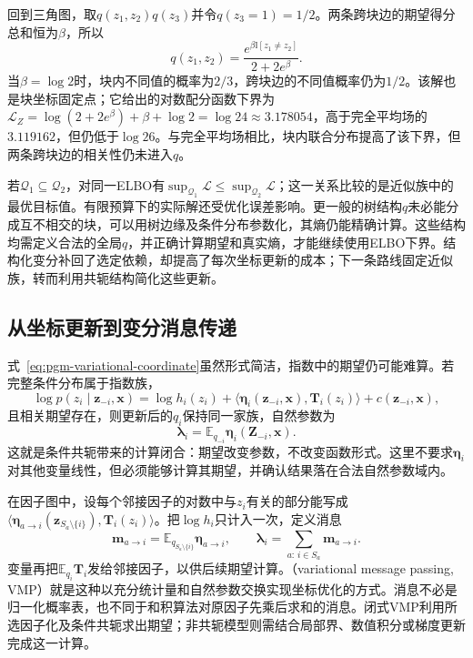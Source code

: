 回到三角图，取$q(z_1,z_2)q(z_3)$并令$q(z_3=1)=1/2$。两条跨块边的期望得分总和恒为$\beta$，所以
\[
  q(z_1,z_2)=
    \frac{e^{\beta\mathbb I[z_1\ne z_2]}}{2+2e^\beta}.
\]
当$\beta=\log2$时，块内不同值的概率为$2/3$，跨块边的不同值概率仍为$1/2$。该解也是块坐标固定点；它给出的对数配分函数下界为$\mathcal L_Z=\log(2+2e^\beta)+\beta+\log2=\log24\approx3.178054$，高于完全平均场的$3.119162$，但仍低于$\log26$。与完全平均场相比，块内联合分布提高了该下界，但两条跨块边的相关性仍未进入$q$。

若$\mathcal Q_1\subseteq\mathcal Q_2$，对同一ELBO有$\sup_{\mathcal Q_1}\mathcal L\leq\sup_{\mathcal Q_2}\mathcal L$；这一关系比较的是近似族中的最优目标值。有限预算下的实际解还受优化误差影响。更一般的树结构$q$未必能分成互不相交的块，可以用树边缘及条件分布参数化，其熵仍能精确计算。这些结构均需定义合法的全局$q$，并正确计算期望和真实熵，才能继续使用ELBO下界。结构化变分补回了选定依赖，却提高了每次坐标更新的成本；下一条路线固定近似族，转而利用共轭结构简化这些更新。

\subsection{从坐标更新到变分消息传递}
\label{sec:pgm-variational-coordinate-vmp}
\label{sec:pgm-variational-vmp}

式~\eqref{eq:pgm-variational-coordinate}虽然形式简洁，指数中的期望仍可能难算。若完整条件分布属于指数族，
\[
  \log p(z_i\mid\bm{z}_{-i},\bm{x})
    =\log h_i(z_i)
      +\langle\bm{\eta}_i(\bm{z}_{-i},\bm{x}),\bm T_i(z_i)\rangle
      +c(\bm{z}_{-i},\bm{x}),
\]
且相关期望存在，则更新后的$q_i$保持同一家族，自然参数为
\begin{equation}
  \bm{\lambda}_i
    =\mathbb E_{q_{-i}}\bm{\eta}_i(\bm{Z}_{-i},\bm{x}).
  \label{eq:pgm-variational-conjugacy}
\end{equation}
这就是条件共轭带来的计算闭合：期望改变参数，不改变函数形式。这里不要求$\bm{\eta}_i$对其他变量线性，但必须能够计算其期望，并确认结果落在合法自然参数域内。

在因子图中，设每个邻接因子的对数中与$z_i$有关的部分能写成$\langle\bm{\eta}_{a\to i}(\bm z_{S_a\setminus\{i\}}),\bm T_i(z_i)\rangle$。把$\log h_i$只计入一次，定义消息
\[
  \bm m_{a\to i}
    =\mathbb E_{q_{S_a\setminus\{i\}}}\bm{\eta}_{a\to i},
  \qquad
  \bm{\lambda}_i=\sum_{a:\,i\in S_a}\bm m_{a\to i}.
\]
变量再把$\mathbb E_{q_i}\bm T_i$发给邻接因子，以供后续期望计算。（variational message passing, VMP）就是这种以充分统计量和自然参数交换实现坐标优化的方式。消息不必是归一化概率表，也不同于和积算法对原因子先乘后求和的消息。闭式VMP利用所选因子化及条件共轭求出期望；非共轭模型则需结合局部界、数值积分或梯度更新完成这一计算。

